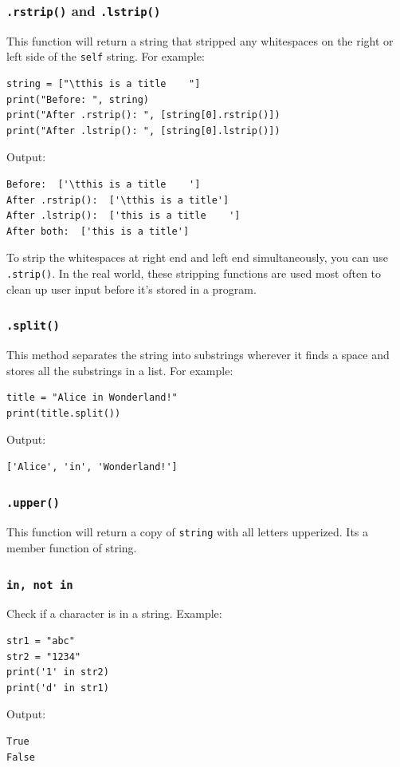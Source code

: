 \documentclass[12pt]{book}
\begin{document}
\subsubsection{\texttt{.rstrip()} and \texttt{.lstrip()}}
\label{sec:orgfa09f4c}
This function will return a string that stripped any whitespaces on the right or left side of the \texttt{self} string. For example:
\begin{verbatim}
string = ["\tthis is a title    "]
print("Before: ", string)
print("After .rstrip(): ", [string[0].rstrip()])
print("After .lstrip(): ", [string[0].lstrip()])
\end{verbatim}
Output:
\begin{verbatim}
Before:  ['\tthis is a title    ']
After .rstrip():  ['\tthis is a title']
After .lstrip():  ['this is a title    ']
After both:  ['this is a title']
\end{verbatim}

To strip the whitespaces at right end and left end simultaneously, you can use \texttt{.strip()}. In the real world, these stripping functions are used most often to clean up user input before it’s stored in a program.
\subsubsection{\texttt{.split()}}
\label{sec:orge977883}
This method separates the string into substrings wherever it finds a space and stores all the substrings in a list. For example:
\begin{verbatim}
title = "Alice in Wonderland!"
print(title.split())
\end{verbatim}
Output:
\begin{verbatim}
['Alice', 'in', 'Wonderland!']
\end{verbatim}

\subsubsection{\texttt{.upper()}}
\label{sec:orgc2e6b68}
This function will return a copy of \texttt{string} with all letters upperized. Its a member function of string.

\subsubsection{\texttt{in, not in}}
\label{sec:org8e39268}
Check if a character is in a string. Example:
\begin{verbatim}
str1 = "abc"
str2 = "1234"
print('1' in str2)
print('d' in str1)
\end{verbatim}
Output:
\begin{verbatim}
True
False
\end{verbatim}
\end{document}
